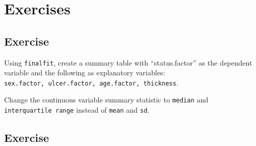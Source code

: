 \documentclass[
  12pt,
  krantz2]{krantz}
\begin{document}
\begin{table}[!h]

\caption{\label{tab:unnamed-chunk-33}Multiple variables by outcome with hypothesis tests: Options including missing data, rounding, and labels.}
\centering
{}
\end{table}

\hypertarget{exercises-3}{%
\section{Exercises}\label{exercises-3}}

\hypertarget{chap08-ex1}{%
\subsection{Exercise}\label{chap08-ex1}}

Using \texttt{finalfit}, create a summary table with ``status.factor'' as the dependent variable and the following as explanatory variables: \texttt{sex.factor,\ ulcer.factor,\ age.factor,\ thickness}.

Change the continuous variable summary statistic to \texttt{median} and \texttt{interquartile\ range} instead of \texttt{mean} and \texttt{sd}.

\hypertarget{chap08-ex2}{%
\subsection{Exercise}\label{chap08-ex2}}
\end{document}
